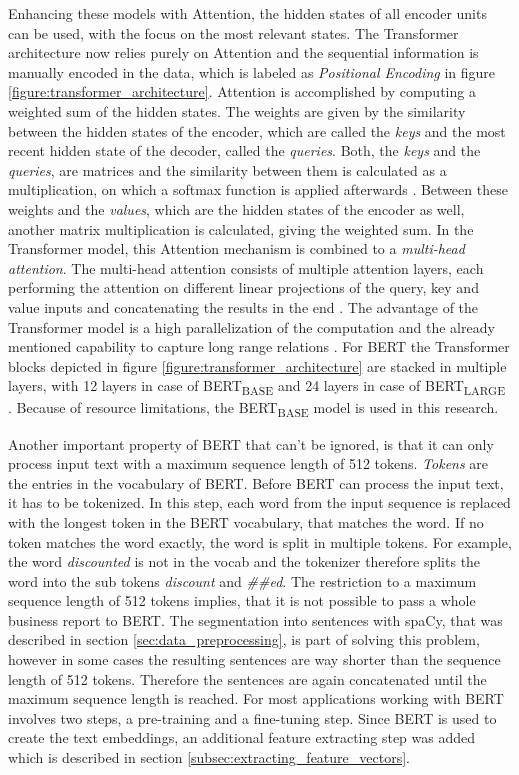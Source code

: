 Enhancing these models with Attention, the hidden states of all encoder units can be used, with the focus on the most relevant states.
The Transformer architecture now relies purely on Attention and the sequential information is manually encoded in the data, which is labeled as \textit{Positional Encoding} in figure \ref{figure:transformer_architecture}.
Attention is accomplished by computing a weighted sum of the hidden states.
The weights are given by the similarity between the hidden states of the encoder, which are called the \textit{keys} and the most recent hidden state of the decoder, called the \textit{queries}.
Both, the \textit{keys} and the \textit{queries}, are matrices and the similarity between them is calculated as a multiplication, on which a softmax function is applied afterwards \cite[p. 4]{Vaswani2017}.
Between these weights and the \textit{values}, which are the hidden states of the encoder as well, another matrix multiplication is calculated, giving the weighted sum.
In the Transformer model, this Attention mechanism is combined to a \textit{multi-head attention}.
The multi-head attention consists of multiple attention layers, each performing the attention on different linear projections of the query, key and value inputs and concatenating the results in the end \cite[pp. 4-5]{Vaswani2017}.
The advantage of the Transformer model is a high parallelization of the computation and the already mentioned capability to capture long range relations \cite[p. 2]{Vaswani2017}.
For \ac{BERT} the Transformer blocks depicted in figure \ref{figure:transformer_architecture} are stacked in multiple layers, with 12 layers in case of BERT\textsubscript{BASE} and 24 layers in case of BERT\textsubscript{LARGE} \cite[p. 3]{Devlin2018}.
Because of resource limitations, the BERT\textsubscript{BASE} model is used in this research.

Another important property of \ac{BERT} that can't be ignored, is that it can only process input text with a maximum sequence length of 512 tokens.
\textit{Tokens} are the entries in the vocabulary of \ac{BERT}.
Before \ac{BERT} can process the input text, it has to be tokenized.
In this step, each word from the input sequence is replaced with the longest token in the \ac{BERT} vocabulary, that matches the word.
If no token matches the word exactly, the word is split in multiple tokens.
For example, the word \textit{discounted} is not in the vocab and the tokenizer therefore splits the word into the sub tokens \textit{discount} and \textit{\#\#ed}.
The restriction to a maximum sequence length of 512 tokens implies, that it is not possible to pass a whole business report to \ac{BERT}.
The segmentation into sentences with spaCy, that was described in section \ref{sec:data_preprocessing}, is part of solving this problem, however in some cases the resulting sentences are way shorter than the sequence length of 512 tokens.
Therefore the sentences are again concatenated until the maximum sequence length is reached.
For most applications working with \ac{BERT} involves two steps, a pre-training and a fine-tuning step.
Since \ac{BERT} is used to create the text embeddings, an additional feature extracting step was added which is described in section \ref{subsec:extracting_feature_vectors}.

